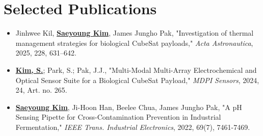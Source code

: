 \documentclass[letterpaper,11pt]{moderncv}
\begin{document}
\section{Selected Publications}
\begin{sloppypar}
\begin{itemize}[leftmargin=1cm, itemsep=0pt, parsep=0pt]
    \item Jinhwee Kil, \textbf{\underline{Saeyoung Kim}}, James Jungho Pak, "Investigation of thermal management strategies for biological CubeSat payloads," \textit{Acta Astronautica}, 2025, 228, 631--642.
    \item \textbf{\underline{Kim, S.}}; Park, S.; Pak, J.J., "Multi-Modal Multi-Array Electrochemical and Optical Sensor Suite for a Biological CubeSat Payload," \textit{MDPI Sensors}, 2024, 24, Art. no. 265.
    \item \textbf{\underline{Saeyoung Kim}}, Ji-Hoon Han, Beelee Chua, James Jungho Pak, "A pH Sensing Pipette for Cross-Contamination Prevention in Industrial Fermentation," \textit{IEEE Trans. Industrial Electronics}, 2022, 69(7), 7461-7469.
\end{itemize}
\end{sloppypar}

\vfill
{}
\end{document}

